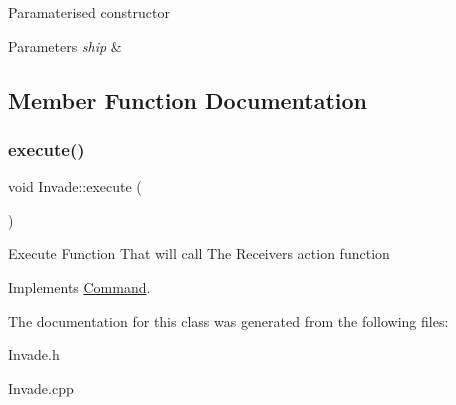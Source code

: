 Paramaterised constructor 
\begin{DoxyParams}{Parameters}
{\em ship} & \\
\hline
\end{DoxyParams}


\subsection{Member Function Documentation}
\mbox{\label{classInvade_a111ebe8b6c5a3646b697ca906c815b35}} 
\subsubsection{\texorpdfstring{execute()}{execute()}}
{\footnotesize\ttfamily void Invade\+::execute (\begin{DoxyParamCaption}{ }\end{DoxyParamCaption})\hspace{0.3cm}{\ttfamily [virtual]}}

Execute Function That will call The Receivers action function 

Implements \hyperlink{classCommand_a6fd7d9bd8df8bfc881e4d6c7cd1878b7}{Command}.



The documentation for this class was generated from the following files\+:\begin{DoxyCompactItemize}
\item 
Invade.\+h\item 
Invade.\+cpp\end{DoxyCompactItemize}
